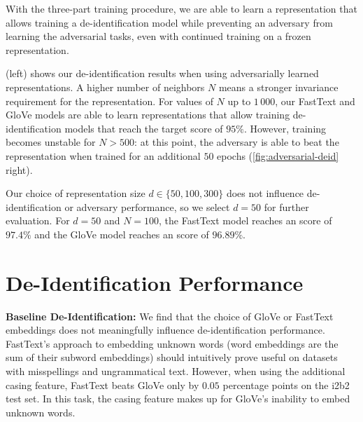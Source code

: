 %
With the three-part training procedure, we are able to learn a representation that allows training a de-identification model while preventing an adversary from learning the adversarial tasks, even with continued training on a frozen representation.

%
 (left) shows our de-identification results when using adversarially learned representations.
%
A higher number of neighbors $N$ means a stronger invariance requirement for the representation.
%
For values of $N$ up to $1\,000$, our FastText and GloVe models are able to learn representations that allow training de-identification models that reach the target \fone score of $95\%$.
%
However, training becomes unstable for $N>500$: at this point, the adversary is able to beat the representation when trained for an additional $50$ epochs (\cref{fig:adversarial-deid} right).

%
Our choice of representation size $d \in \{50, 100, 300\}$ does not influence de-identifi\-ca\-tion or adversary performance, so we select $d=50$ for further evaluation.
%
For $d=50$ and $N=100$, the FastText model reaches an \fone score of $97.4\%$ and the GloVe model reaches an \fone score of $96.89\%$.

\begin{figure*}
    \centering
    
    \caption[De-identification with adversarially learned representations]{%
        Left: de-identification \fone scores of our models using an adversarially trained representation with different numbers of neighbors $N$ for the representation invariance requirement.
        Right: mean adversary accuracy when trained on the frozen representation for an additional $50$ epochs.
    }\label{fig:adversarial-deid}
\end{figure*}

\section{De-Identification Performance}

\textbf{Baseline De-Identification:}
%
We find that the choice of GloVe or FastText embeddings does not meaningfully influence de-identification performance.
%
FastText's approach to embedding unknown words (word embeddings are the sum of their subword embeddings) should intuitively prove useful on datasets with misspellings and ungrammatical text.
%
However, when using the additional casing feature, FastText beats GloVe only by $0.05$ percentage points on the i2b2 test set.
%
In this task, the casing feature makes up for GloVe's inability to embed unknown words.

